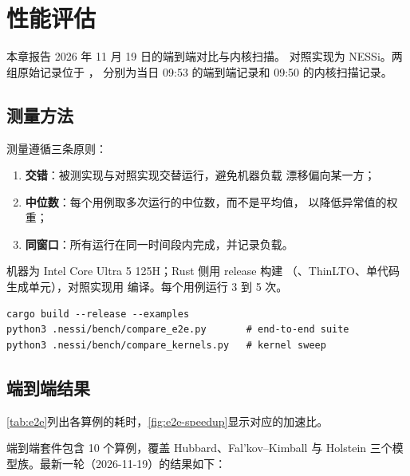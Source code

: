 \chapter{性能评估}
\label{ch:performance}

本章报告 2026 年 11 月 19 日的端到端对比与内核扫描。
对照实现为 NESSi。两组原始记录位于 ，
分别为当日 09:53 的端到端记录和 09:50 的内核扫描记录。

\section{测量方法}
\label{sec:bench-method}

测量遵循三条原则：
\begin{enumerate}[label=(\arabic*)]
    \item \textbf{交错}：被测实现与对照实现交替运行，避免机器负载
          漂移偏向某一方；
    \item \textbf{中位数}：每个用例取多次运行的中位数，而不是平均值，
          以降低异常值的权重；
    \item \textbf{同窗口}：所有运行在同一时间段内完成，并记录负载。
\end{enumerate}
机器为 Intel Core Ultra 5 125H；Rust 侧用 release 构建
（、ThinLTO、单代码生成单元），对照实现用
 编译。每个用例运行 3 到 5 次。

\begin{lstlisting}[numbers=none]
cargo build --release --examples
python3 .nessi/bench/compare_e2e.py       # end-to-end suite
python3 .nessi/bench/compare_kernels.py   # kernel sweep
\end{lstlisting}

\section{端到端结果}
\label{sec:bench-e2e}

\cref{tab:e2e}列出各算例的耗时，\cref{fig:e2e-speedup}显示对应的加速比。

端到端套件包含 10 个算例，覆盖 Hubbard、Fal'kov--Kimball 与
Holstein 三个模型族。最新一轮（2026-11-19）的结果如下：

